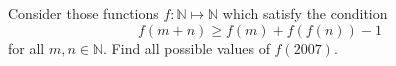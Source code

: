 Consider those functions $ f: \mathbb{N} \mapsto \mathbb{N}$ which satisfy the condition\[ f(m + n) \geq f(m) + f(f(n)) - 1 \]
for all $ m,n \in \mathbb{N}.$ Find all possible values of $ f(2007).$
